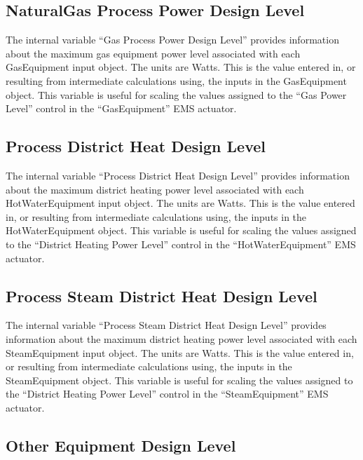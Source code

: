 \subsection{NaturalGas Process Power Design Level}\label{gas-process-power-design-level}

The internal variable ``Gas Process Power Design Level'' provides information about the maximum gas equipment power level associated with each GasEquipment input object. The units are Watts. This is the value entered in, or resulting from intermediate calculations using, the inputs in the GasEquipment object. This variable is useful for scaling the values assigned to the ``Gas Power Level'' control in the ``GasEquipment'' EMS actuator.

\subsection{Process District Heat Design Level}\label{process-district-heat-design-level}

The internal variable ``Process District Heat Design Level'' provides information about the maximum district heating power level associated with each HotWaterEquipment input object. The units are Watts. This is the value entered in, or resulting from intermediate calculations using, the inputs in the HotWaterEquipment object. This variable is useful for scaling the values assigned to the ``District Heating Power Level'' control in the ``HotWaterEquipment'' EMS actuator.

\subsection{Process Steam District Heat Design Level}\label{process-steam-district-heat-design-level}

The internal variable ``Process Steam District Heat Design Level'' provides information about the maximum district heating power level associated with each SteamEquipment input object. The units are Watts. This is the value entered in, or resulting from intermediate calculations using, the inputs in the SteamEquipment object. This variable is useful for scaling the values assigned to the ``District Heating Power Level'' control in the ``SteamEquipment'' EMS actuator.

\subsection{Other Equipment Design Level}\label{other-equipment-design-level}

